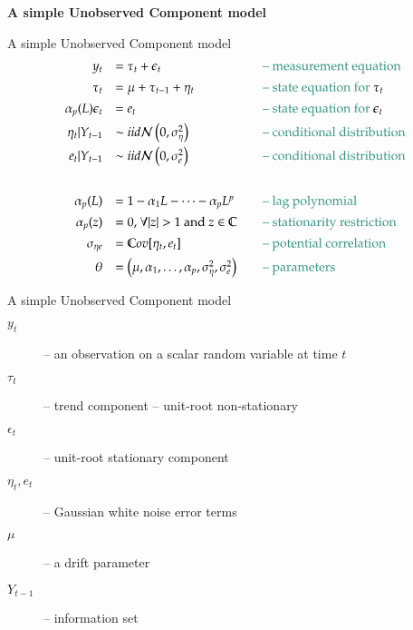 \documentclass[notes,blackandwhite,mathsans,usenames,dvipsnames]{beamer}
\begin{document}
{
\begin{frame}

\begin{adjustwidth}{-0.5cm}{0cm}
\vspace{8.3cm}\Large
\textbf{{\color{lightgray}A simple} {\color{mcxs1}Unobserved Component} {\color{lightgray} model}}
\end{adjustwidth}

\end{frame}
}



\begin{frame}{A simple Unobserved Component model}
$$
\begin{array}{rlll}
y_t &= \tau_t + \epsilon_t&&\text{\color{mcxs2}-- measurement equation}\\[1ex]
\tau_t &= \mu + \tau_{t-1} + \eta_t&&\text{\color{mcxs2}-- state equation for }\tau_t\\[1ex]
\alpha_p(L)\epsilon_t &=  e_t&&\text{\color{mcxs2}-- state equation for }\epsilon_t\\[1ex]
\eta_t|Y_{t-1} &\sim iid\mathcal{N}\left(0,\sigma_\eta^2\right)&&\text{\color{mcxs2}-- conditional distribution}\\[1ex]
e_t |Y_{t-1} &\sim iid\mathcal{N}\left(0,\sigma_e^2\right)&&\text{\color{mcxs2}-- conditional distribution}\\[5ex]
\alpha_p(L) &= 1-\alpha_1L - \dots - \alpha_pL^p&&\text{\color{mcxs2}-- lag polynomial}\\[1ex]
\alpha_p(z)&=0\text{, } \forall |z|>1\text{ and }z\in\mathbb{C}&&\text{\color{mcxs2}-- stationarity restriction}\\[1ex]
\sigma_{\eta e}&= \mathbb{C}ov[\eta_t,e_t]&&\text{\color{mcxs2}-- potential correlation}\\[1ex]
\theta&=\left(\mu,\alpha_1,\dots,\alpha_p,\sigma_\eta^2,\sigma_e^2\right)&&\text{\color{mcxs2}-- parameters}\\
\end{array}
$$
\end{frame}





\begin{frame}{A simple Unobserved Component model}

\begin{description}
\item[$y_t$] {\color{mcxs2}-- an observation on a scalar random variable at time $t$ }
\item[$\tau_t$] {\color{mcxs2}-- trend component -- unit-root non-stationary}
\item[$\epsilon_t$] {\color{mcxs2}-- unit-root stationary component }
\item[$\eta_t, e_t$] {\color{mcxs2}-- Gaussian white noise error terms }
\item[$\mu$] {\color{mcxs2}-- a drift  parameter}
\item[$Y_{t-1}$] {\color{mcxs2}-- information set}
\end{description}
\end{frame}
\end{document}
